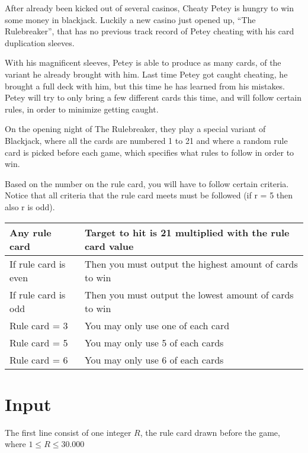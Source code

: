 
After already been kicked out of several casinos, Cheaty Petey is hungry to win some money in blackjack. Luckily a new casino just opened up, “The Rulebreaker”, that has no previous track record of Petey cheating with his card duplication sleeves.

With his magnificent sleeves, Petey is able to produce as many cards, of the variant he already brought with him. Last time Petey got caught cheating, he brought a full deck with him, but this time he has learned from his mistakes. Petey will try to only bring a few different cards this time, and will follow certain rules, in order to minimize getting caught.

On the opening night of The Rulebreaker, they play a special variant of Blackjack, where all the cards are numbered 1 to 21 and where a random rule card is picked before each game, which specifies what rules to follow in order to win. 

Based on the number on the rule card, you will have to follow certain criteria. Notice that all criteria that the rule card meets must be followed (if r = 5 then also r is odd). 


\begin{tabular}{|ll|}
\hline
\textbf{Any rule card} & \textbf{Target to hit is 21 multiplied with the rule card value} \\ \hline
If rule card is even & Then you must output the highest amount of cards to win \\ \hline
If rule card is odd   & Then you must output the lowest amount of cards to win  \\ \hline
Rule card = 3         & You may only use one of each card                       \\ \hline
Rule card = 5         & You may only use 5 of each cards                        \\ \hline
Rule card = 6         & You may only use 6 of each cards                        \\ \hline
\end{tabular}

\section*{Input}
The first line consist of one integer $R$, the rule card drawn before the game, where 
$1\leq R \leq 30.000$

